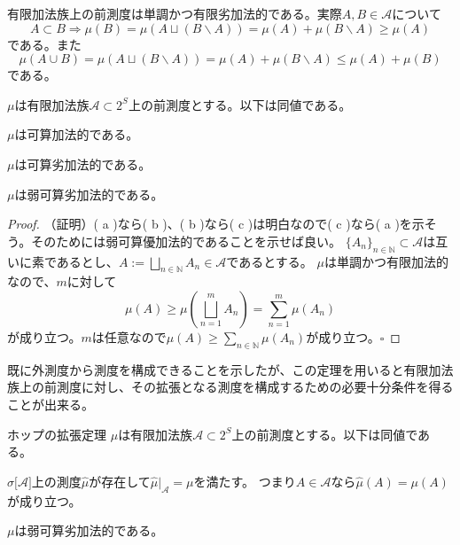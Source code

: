 \documentclass[../root.tex]{subfiles}
\begin{document}
有限加法族上の前測度は単調かつ有限劣加法的である。実際$ A, B\in\mathscr{A} $について
\[ A\subset B \Rightarrow \mu( B )=\mu( A\sqcup( B\backslash A ) )=\mu( A )+\mu( B\backslash A )\ge\mu( A ) \]
である。また
\[ \mu( A\cup B )=\mu( A\sqcup( B\backslash A ) )=\mu( A )+\mu( B\backslash A )\le\mu( A )+\mu( B ) \]
である。

\begin{Lem}{}{}
$ \mu $は有限加法族$ \mathscr{A}\subset 2^{S} $上の前測度とする。以下は同値である。
\begin{EnumEquiv}
\item $ \mu $は可算加法的である。
\item $ \mu $は可算劣加法的である。
\item $ \mu $は弱可算劣加法的である。
\end{EnumEquiv}
\end{Lem}

\begin{proof}
（証明）( a )なら( b )、( b )なら( c )は明白なので( c )なら( a )を示そう。そのためには弱可算優加法的であることを示せば良い。
$ \lbrace A_{n} \rbrace_{n\in\mathbb{N}}\subset\mathscr{A} $は互いに素であるとし、$ A:=\bigsqcup_{n\in\mathbb{N}}A_{n}\in\mathscr{A} $であるとする。
$ \mu $は単調かつ有限加法的なので、$ m $に対して
\[ \mu( A )\ge\mu\left( \bigsqcup_{n=1}^{m} A_{n} \right)=\sum_{n=1}^{m}\mu( A_{n} ) \]
が成り立つ。$ m $は任意なので$ \mu( A )\ge\sum_{n\in\mathbb{N}}\mu( A_{n} ) $が成り立つ。$ \square $
\end{proof}

既に外測度から測度を構成できることを示したが、この定理を用いると有限加法族上の前測度に対し、その拡張となる測度を構成するための必要十分条件を得ることが出来る。

\begin{Thm}{ホップの拡張定理}{}
$ \mu $は有限加法族$ \mathscr{A}\subset 2^{S} $上の前測度とする。以下は同値である。
\begin{EnumEquiv}
\item $ \sigma\lbrack \mathscr{A} \rbrack $上の測度$ \widehat{\mu} $が存在して$ \widehat{\mu}|_{\mathscr{A}}=\mu $を満たす。
つまり$ A\in\mathscr{A} $なら$ \widehat{\mu}( A )=\mu( A ) $が成り立つ。
\item $ \mu $は弱可算劣加法的である。
\end{EnumEquiv}
\end{Thm}
\end{document}
